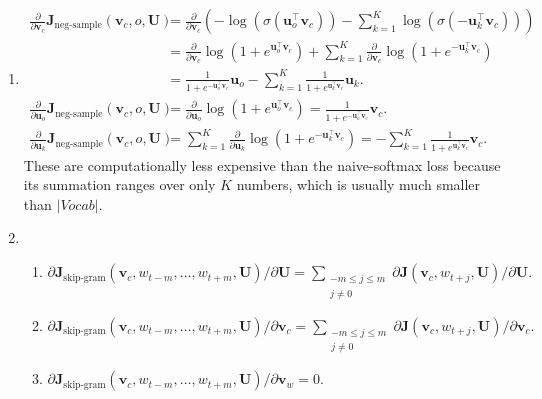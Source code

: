 \documentclass[12pt]{article}
\begin{document}
\begin{enumerate}[label=(\alph*)]
\item \begin{align*} \frac{\partial}{\partial\bm{v}_c}\bm{J}_{\textrm{neg-sample}}(\bm{v}_c,o,\bm{U}) &=\frac{\partial}{\partial\bm{v}_c}\left(-\log(\sigma(\bm{u}_o^\top\bm{v}_c))-\sum_{k=1}^K\log(\sigma(-\bm{u}_k^\top\bm{v}_c))\right) \\
&=\frac{\partial}{\partial\bm{v}_c}\log(1+e^{\bm{u}_o^\top\bm{v}_c})+\sum_{k=1}^K\frac{\partial}{\partial\bm{v}_c}\log(1+e^{-\bm{u}_k^\top\bm{v}_c}) \\
&=\frac{1}{1+e^{-\bm{u}_o^\top\bm{v}_c}}\bm{u}_o-\sum_{k=1}^K\frac{1}{1+e^{\bm{u}_k^\top\bm{v}_c}}\bm{u}_k. \\
\frac{\partial}{\partial\bm{u}_o}\bm{J}_{\textrm{neg-sample}}(\bm{v}_c,o,\bm{U}) &=\frac{\partial}{\partial\bm{u}_o}\log(1+e^{\bm{u}_o^\top\bm{v}_c})=\frac{1}{1+e^{-\bm{u}_o^\top\bm{v}_c}}\bm{v}_c.\\
\frac{\partial}{\partial\bm{u}_k}\bm{J}_{\textrm{neg-sample}}(\bm{v}_c,o,\bm{U}) &=\sum_{k=1}^K\frac{\partial}{\partial\bm{u}_k}\log(1+e^{-\bm{u}_k^\top\bm{v}_c})=-\sum_{k=1}^K\frac{1}{1+e^{\bm{u}_k^\top\bm{v}_c}}\bm{v}_c.
\end{align*}
These are computationally less expensive than the naive-softmax loss because its summation ranges over only $K$ numbers, which is usually much smaller than $|Vocab|$.
\item \begin{enumerate}[label=(\roman*)]
  \item $\partial\bm{J}_{\textrm{skip-gram}}(\bm{v}_c,w_{t-m},\ldots,w_{t+m},\bm{U})/\partial\bm{U}=\sum\limits_{\substack{-m\leq j\leq m\\j\neq 0}}\partial\bm{J}(\bm{v}_c,w_{t+j},\bm{U})/\partial\bm{U}.$
  \item $\partial\bm{J}_{\textrm{skip-gram}}(\bm{v}_c,w_{t-m},\ldots,w_{t+m},\bm{U})/\partial\bm{v}_c=\sum\limits_{\substack{-m\leq j\leq m\\j\neq 0}}\partial\bm{J}(\bm{v}_c,w_{t+j},\bm{U})/\partial\bm{v}_c.$
  \item $\partial\bm{J}_{\textrm{skip-gram}}(\bm{v}_c,w_{t-m},\ldots,w_{t+m},\bm{U})/\partial\bm{v}_w=0.$
\end{enumerate}
\end{enumerate}
\end{document}
